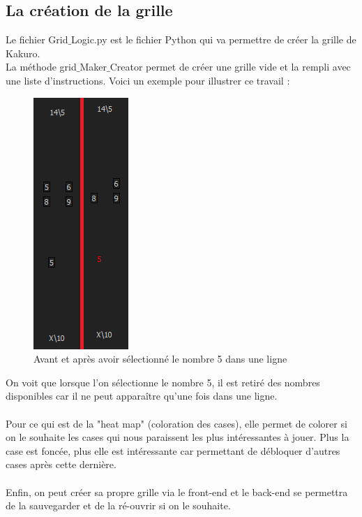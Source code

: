 \documentclass[12pt]{article}
\begin{document}
\subsection{La création de la grille}
Le fichier Grid$\_$Logic.py est le fichier Python qui va permettre de créer la grille de Kakuro.\\
La méthode grid$\_$Maker$\_$Creator permet de créer une grille vide et la rempli avec une liste d'instructions.
\newpage
Voici un exemple pour illustrer ce travail : 
\begin{figure}[ht]
  \begin{center}
    \includegraphics[scale=0.5]{./ressources/retrait.png} 
  \end{center}
  \caption{Avant et après avoir sélectionné le nombre 5 dans une ligne}
\end{figure} 

On voit que lorsque l'on sélectionne le nombre 5, il est retiré des nombres disponibles car il ne peut apparaître qu'une fois dans une ligne. \\ \\
Pour ce qui est de la "heat map" (coloration des cases), elle permet de colorer si on le souhaite les cases qui nous paraissent les plus intéressantes à jouer. Plus la case est foncée, plus elle est intéressante car permettant de débloquer d'autres cases après cette dernière. \\ \\
Enfin, on peut créer sa propre grille via le front-end et le back-end se permettra de la sauvegarder et de la ré-ouvrir si on le souhaite. 
\newpage
\end{document}
